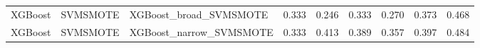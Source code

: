 \begin{tabular}{lllllllll}
                     XGBoost &            SVMSMOTE &                       XGBoost\_broad\_SVMSMOTE &     0.333 &                     0.246 &                 0.333 &                  0.270 &                                   0.373 &    0.468 \\
                     XGBoost &            SVMSMOTE &                      XGBoost\_narrow\_SVMSMOTE &     0.333 &                     0.413 &                 0.389 &                  0.357 &                                   0.397 &    0.484 \\
\bottomrule
\end{tabular}
